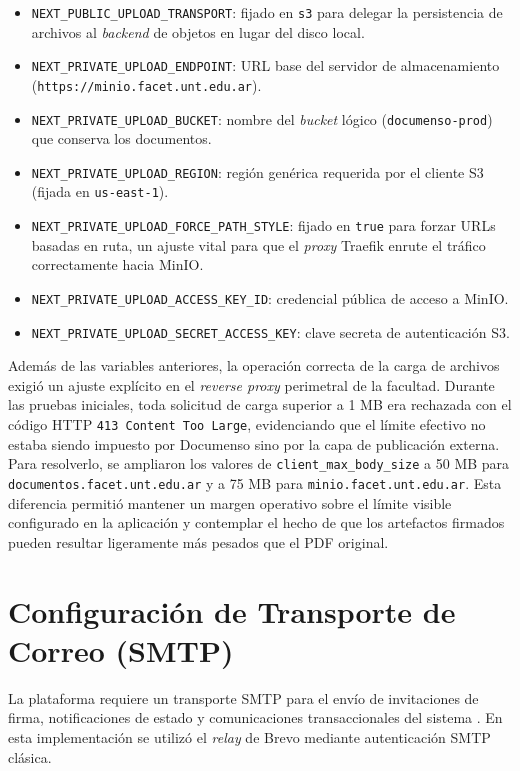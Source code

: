 \begin{itemize}
    \item \texttt{NEXT\_PUBLIC\_UPLOAD\_TRANSPORT}: fijado en \texttt{s3} para delegar la persistencia de archivos al \textit{backend} de objetos en lugar del disco local.
    \item \texttt{NEXT\_PRIVATE\_UPLOAD\_ENDPOINT}: URL base del servidor de almacenamiento (\nolinkurl{https://minio.facet.unt.edu.ar}).
    \item \texttt{NEXT\_PRIVATE\_UPLOAD\_BUCKET}: nombre del \textit{bucket} lógico (\texttt{documenso-prod}) que conserva los documentos.
    \item \texttt{NEXT\_PRIVATE\_UPLOAD\_REGION}: región genérica requerida por el cliente S3 (fijada en \texttt{us-east-1}).
    \item \texttt{NEXT\_PRIVATE\_UPLOAD\_FORCE\_PATH\_STYLE}: fijado en \texttt{true} para forzar URLs basadas en ruta, un ajuste vital para que el \textit{proxy} Traefik enrute el tráfico correctamente hacia MinIO.
    \item \texttt{NEXT\_PRIVATE\_UPLOAD\_ACCESS\_KEY\_ID}: credencial pública de acceso a MinIO.
    \item \texttt{NEXT\_PRIVATE\_UPLOAD\_SECRET\_ACCESS\_KEY}: clave secreta de autenticación S3.
\end{itemize}

Además de las variables anteriores, la operación correcta de la carga de archivos exigió un ajuste explícito en el \textit{reverse proxy} perimetral de la facultad. Durante las pruebas iniciales, toda solicitud de carga superior a 1 MB era rechazada con el código HTTP \texttt{413 Content Too Large}, evidenciando que el límite efectivo no estaba siendo impuesto por Documenso sino por la capa de publicación externa. Para resolverlo, se ampliaron los valores de \texttt{client\_max\_body\_size} a 50 MB para \nolinkurl{documentos.facet.unt.edu.ar} y a 75 MB para \nolinkurl{minio.facet.unt.edu.ar}. Esta diferencia permitió mantener un margen operativo sobre el límite visible configurado en la aplicación y contemplar el hecho de que los artefactos firmados pueden resultar ligeramente más pesados que el PDF original.

\section{Configuración de Transporte de Correo (SMTP)}
\label{AppendixB:SMTP}

La plataforma requiere un transporte SMTP para el envío de invitaciones de firma, notificaciones de estado y comunicaciones transaccionales del sistema \cite{documenso_email_config}. En esta implementación se utilizó el \textit{relay} de Brevo mediante autenticación SMTP clásica.

